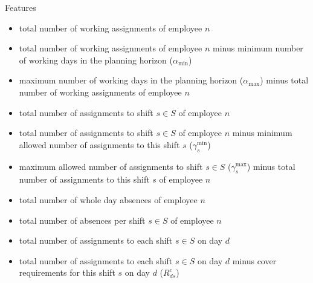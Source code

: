 \documentclass[aspectratio=1610]{beamer}
\renewcommand{\footnotesize}{\scriptsize}
\begin{document}
\begin{frame}{Features}
	\footnotesize
	\begin{itemize}
		\item total number of working assignments of employee $n$  
		\item total number of working assignments of employee $n$ minus minimum number of working days in the planning horizon ($\alpha_{\min}$) 
		\item maximum number of working days in the planning horizon ($\alpha_{\max}$) minus total number of working assignments of employee $n$ 
		\item total number of assignments to shift $s \in S$ of employee $n$ 
		\item total number of assignments to shift $s \in S$ of employee $n$ minus minimum allowed number of assignments to this shift $s$ ($\gamma^{\min}_s$)  
		\item maximum allowed number of assignments to shift $s \in S$ ($\gamma^{\max}_s$) minus total number of assignments to this shift $s$ of employee $n$  
		\item total number of whole day absences of employee $n$
		\item total number of absences per shift $s \in S$ of employee $n$  
	\end{itemize}

	\medskip
	\footnotesize
	\begin{itemize}
		\item total number of assignments to each shift $s \in S$ on day $d$  
		\item total number of assignments to each shift $s \in S$ on day $d$ minus cover requirements for this shift $s$ on day $d$ ($R^\text{c}_{ds}$)  
	\end{itemize}
\end{frame}
\end{document}
